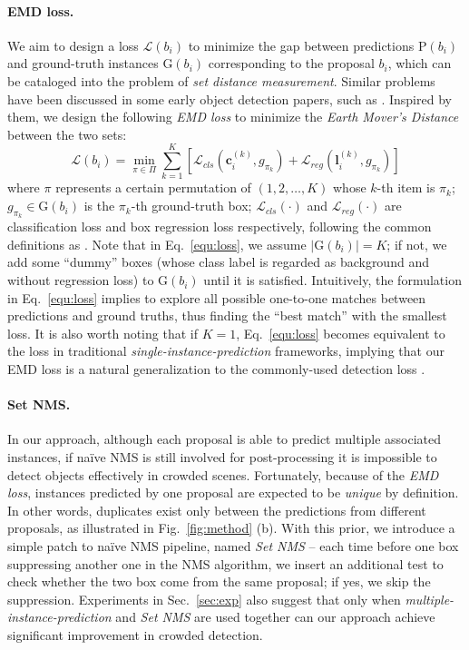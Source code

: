 \documentclass[10pt,twocolumn,letterpaper]{article}
\begin{document}
\paragraph{EMD loss. }
We aim to design a loss $\mathcal{L}(b_i)$ to minimize the gap between predictions $\mathrm{P}(b_i)$ and ground-truth instances $\mathrm{G}(b_i)$ corresponding to the proposal $b_i$, which can be cataloged into the problem of \emph{set distance measurement}. Similar problems have been discussed in some early object detection papers, such as \cite{szegedy2014scalable,erhan2014scalable,stewart2016end}. Inspired by them, we design the following \emph{EMD loss} to minimize the \emph{Earth Mover's Distance} between the two sets:
\begin{equation}
	\mathcal{L}(b_i) = \min_{\pi \in \Pi} \sum_{k=1}^{K} \left[ 
	\mathcal{L}_{cls} (\mathbf{c}_i^{(k)}, g_{\pi_k}) + \mathcal{L}_{reg} (\mathbf{l}_i^{(k)}, g_{\pi_k})
	\right]
\label{equ:loss}
\end{equation}
where $\pi$ represents a certain permutation of $(1, 2, \dots, K)$ whose $k$-th item is $\pi_k$; $g_{\pi_k} \in \mathrm{G}(b_i)$ is the $\pi_k$-th ground-truth box; $\mathcal{L}_{cls}(\cdot)$ and $\mathcal{L}_{reg}(\cdot)$ are classification loss and box regression loss respectively, following the common definitions as \cite{ren2015faster,liu2016ssd,lin2017feature,lin2017focal,he2017mask}. Note that in Eq.~\ref{equ:loss}, we assume $|\mathrm{G}(b_i)|=K$; if not, we add some ``dummy'' boxes (whose class label is regarded as background and without regression loss) to $\mathrm{G}(b_i)$ until it is satisfied. Intuitively, the formulation in Eq.~\ref{equ:loss} implies to explore all possible one-to-one matches between predictions and ground truths, thus finding the ``best match'' with the smallest loss. It is also worth noting that if $K=1$, Eq.~\ref{equ:loss} becomes equivalent to the loss in traditional \emph{single-instance-prediction} frameworks, implying that our EMD loss is a natural generalization to the commonly-used detection loss \cite{ren2015faster,liu2016ssd,lin2017feature,he2017mask}. 

\paragraph{Set NMS. }
In our approach, although each proposal is able to predict multiple associated instances, if na\"ive NMS is still involved for post-processing it is impossible to detect objects effectively in crowded scenes. Fortunately, because of the \emph{EMD loss}, instances predicted by one proposal are expected to be \emph{unique} by definition. In other words, duplicates exist only between the predictions from different proposals, as illustrated in Fig.~\ref{fig:method} (b). With this prior, we introduce a simple patch to na\"ive NMS pipeline, named \emph{Set NMS} -- each time before one box suppressing another one in the NMS algorithm, we insert an additional test to check whether the two box come from the same proposal; if yes, we skip the suppression. Experiments in Sec.~\ref{sec:exp} also suggest that only when \emph{multiple-instance-prediction} and \emph{Set NMS} are used together can our approach achieve significant improvement in crowded detection. 
\end{document}
